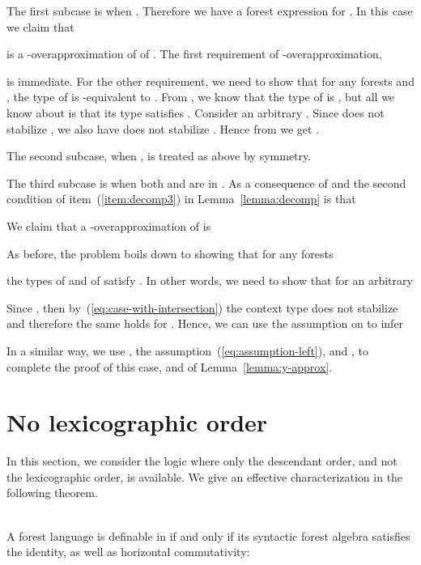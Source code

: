 \documentclass{LMCS}
\begin{document}
The first subcase is when .
Therefore we have a  forest expression for . In
this case we claim that

is a -overapproximation of of .  The first
requirement of  -overapproximation, 

is immediate. For the other requirement, we need to show that for any
forests  and , the type of
 is -equivalent to .  From , we know that the type of  is , but all we know
about  is that its type  satisfies . Consider an arbitrary . Since  does not stabilize
, we also have  does not stabilize . Hence from  we get .

The second subcase, when , is treated as above by symmetry.

The third subcase is when both  and  are in .
As a consequence of  and the second condition of item~(\ref{item:decomp3}) in Lemma~\ref{lemma:decomp} is that

We claim that a -overapproximation of  is 

As before, the problem boils down to showing that for any forests 

the types  of  and  of  satisfy . In other words, we need to show that for an arbitrary  

Since , then by~(\ref{eq:case-with-intersection}) the context
type  does not stabilize  and therefore the same holds for
. Hence, we can use the assumption on 
to infer

In a similar way, we use , the
assumption~(\ref{eq:assumption-left}), and , to
complete the proof of this case, and of  Lemma~\ref{lemma:y-approx}.



\section{No lexicographic order }\label{sec:nolex}
In this section, we consider the logic \Dtwo where only the descendant
order, and not the lexicographic order, is available. We give an
effective characterization in the following theorem.
\begin{thm}\label{thm:main-commutative}\ \\
 A forest language is definable in \Dtwo if and only if its syntactic
  forest algebra satisfies the  identity, as well as
  horizontal commutativity:

\end{thm}
\end{document}
